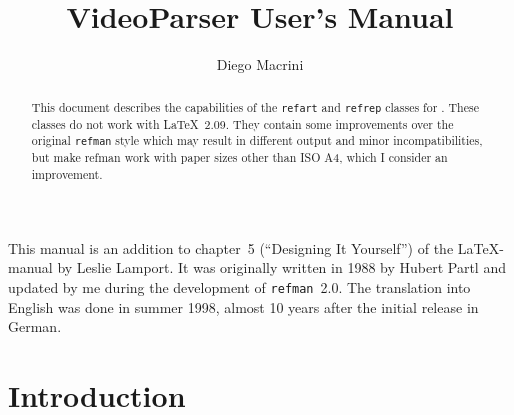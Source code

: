 \documentclass[twoside,letterpaper]{refart}
\title{VideoParser User's Manual}
\author{Diego Macrini}
\date{}
\begin{document}
\maketitle

\begin{abstract}
        This document describes the capabilities of the 
        \texttt{refart} and \texttt{refrep} classes for \LaTeXe. 
        These classes do not work with \LaTeX\ 2.09. They contain some 
        improvements over the original \texttt{refman} style which may result 
        in different output and minor incompatibilities, but make refman 
        work with paper sizes other than ISO A4, which I consider an 
        improvement.
\end{abstract}


This manual is an addition to chapter~5 (``Designing It Yourself'') of 
the \LaTeX-manual by Leslie Lamport.  It was originally written in 
1988 by Hubert Partl and updated by me during the development of 
\texttt{refman}~2.0.  The translation into English was done in summer 
1998, almost 10 years after the initial release in German.

\tableofcontents

\newpage



\section{Introduction}


\printindex
\end{document}

